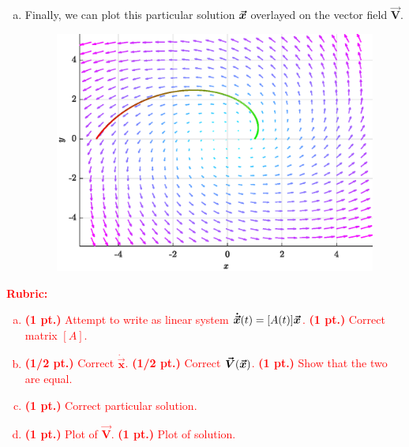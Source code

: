 \documentclass[12pt]{article} %
\newcommand{\vecxdot}{\boldsymbol{\dot{\vec{x}}}}
\newcommand{\vecfieldV}{\boldsymbol{\vec{V}}}
\begin{document}
\begin{solution}
\begin{enumerate}[(a)]
\item Finally, we can plot this particular solution $\boldsymbol{\vec{x}}$ overlayed on the vector field $\vecfieldV$.
\begin{figure}[H]
    \centering
    \includegraphics[width=.6\textwidth]{figures/flow}   
\end{figure}
\end{enumerate}
\end{solution}
\vspace*{1cm}
\textcolor{red}{
\noindent \textbf{Rubric:}
\begin{enumerate}[(a)]
    \item \textbf{(1 pt.)} Attempt to write as linear system $\vecxdot(t) = [A(t)] \vecx$. \textbf{(1 pt.)} Correct matrix $[A]$.
    \item \textbf{(1/2 pt.)} Correct $\vecxdot$. \textbf{(1/2 pt.)} Correct $\vecfieldV(\vecx)$. \textbf{(1 pt.)} Show that the two are equal.
	\item \textbf{(1 pt.)} Correct particular solution.
    \item \textbf{(1 pt.)} Plot of $\vecfieldV$. \textbf{(1 pt.)} Plot of solution.
\end{enumerate}
}
\end{document}
